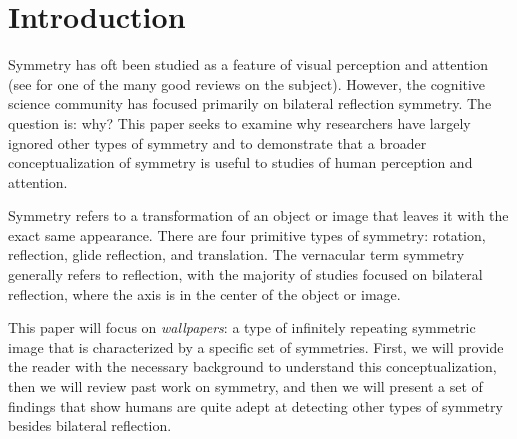 \section{Introduction}
Symmetry has oft been studied as a feature of visual perception and attention (see \citet{review} for one of the many good reviews on the subject). However,  the cognitive science community has focused primarily on bilateral reflection symmetry. The question is: why? This paper seeks to examine why researchers have largely ignored other types of symmetry and to demonstrate that a broader conceptualization of symmetry is useful to studies of human perception and attention.

Symmetry refers to a transformation of an object or image that leaves it with the exact same appearance. There are four primitive types of symmetry: rotation, reflection, glide reflection, and translation. The vernacular term symmetry generally refers to reflection, with the majority of studies focused on bilateral reflection, where the axis is in the center of the object or image.

This paper will focus on \textit{wallpapers}: a type of infinitely repeating symmetric image that is characterized by a specific set of symmetries. First, we will provide the reader with the necessary background to understand this conceptualization, then we will review past work on symmetry, and then we will present a set of findings that show humans are quite adept at detecting other types of symmetry besides bilateral reflection.



